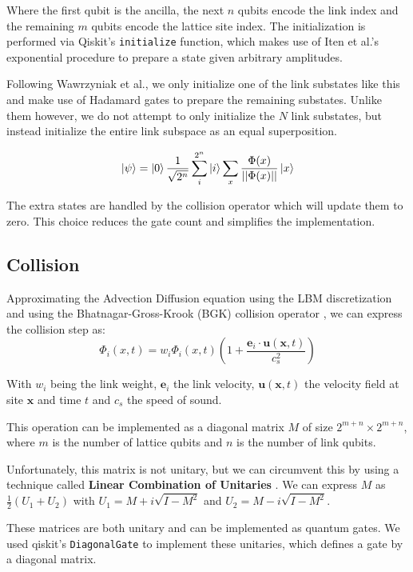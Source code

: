 \documentclass[pdflatex,sn-mathphys-num]{sn-jnl}%
\begin{document}
Where the first qubit is the ancilla, the next $n$ qubits encode the link index and the remaining $m$ qubits encode the lattice site index.
The initialization is performed via Qiskit's \texttt{initialize} function, which makes use of Iten et al.'s exponential procedure \cite{iten2016isometries} to prepare a state given arbitrary amplitudes.

Following Wawrzyniak et al., we only initialize one of the link substates like this and make use of Hadamard gates to prepare the remaining substates.
Unlike them however, we do not attempt to only initialize the $N$ link substates, but instead initialize the entire link subspace as an equal superposition.

\begin{equation}
    \ket{\psi} = \ket{0}\frac{1}{\sqrt{2^n}}\sum_{i}^{2^n} \ket{i}\sum_{x}\frac{\Phi(x)}{||\Phi(x)||} \ket{x}
\end{equation}

The extra states are handled by the collision operator which will update them to zero.
This choice reduces the gate count and simplifies the implementation.

\subsection{Collision}
Approximating the Advection Diffusion equation using the LBM discretization and using the Bhatnagar-Gross-Krook (BGK) collision operator \cite{bhatnagar1954model}, we can express the collision step as:
\begin{equation}
    \Phi_i(x,t) = w_i \Phi_i(x,t)(1 + \frac{\mathbf{e}_i \cdot \mathbf{u}(\mathbf{x},t)}{c_s^2})
\end{equation}

With $w_i$ being the link weight, $\mathbf{e}_i$ the link velocity, $\mathbf{u}(\mathbf{x},t)$ the velocity field at site $\mathbf{x}$ and time $t$ and $c_s$ the speed of sound.

This operation can be implemented as a diagonal matrix $M$ of size  $2^{m+n} \times 2^{m+n}$, where $m$ is the number of lattice qubits and $n$ is the number of link qubits.

Unfortunately, this matrix is not unitary, but we can circumvent this by using a technique called \textbf{Linear Combination of Unitaries} \cite{childs2012hamiltonian}.
We can express $M$ as $\frac{1}{2}(U_1 + U_2)$ with $U_1 = M + i\sqrt{I - M^2}$ and $U_2 = M - i\sqrt{I - M^2}$.

These matrices are both unitary and can be implemented as quantum gates.
We used qiskit's \texttt{DiagonalGate} to implement these unitaries, which defines a gate by a diagonal matrix.
\end{document}
